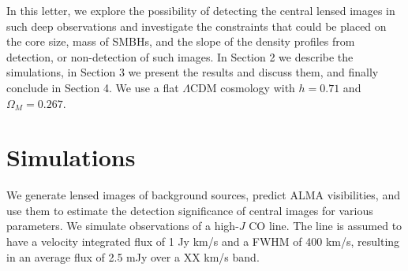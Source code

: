 \documentclass[chicago]{emulateapj}
\begin{document}
 In this letter, we explore the possibility of detecting the central lensed images in such deep observations and investigate the constraints that could be placed on the core size, mass of SMBHs, and the slope of the density profiles from detection, or non-detection of such images. In Section 2 we describe the simulations, in Section 3 we present the results and discuss them, and finally conclude in Section 4. We use a flat $\Lambda$CDM cosmology with $h=0.71$ and $\Omega_M=0.267$.
 


\section{Simulations}
We generate lensed images of background sources, predict ALMA visibilities, and use them to estimate the detection significance of central images for various parameters. We simulate observations of a high-$J$ CO line. The line is assumed to have a velocity integrated flux of 1 Jy km/s and a FWHM of 400 km/s, resulting in an average flux of 2.5 mJy over a XX km/s band. 
\end{document}
